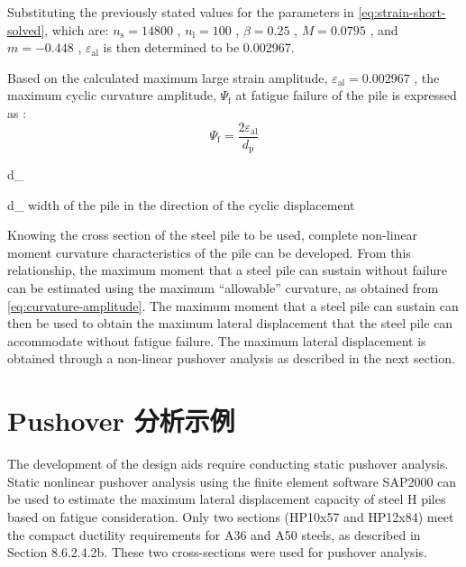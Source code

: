 Substituting the previously stated values for the parameters in \cref{eq:strain-short-solved}, which are: $n_\text{s}=14800$ , $n_\text{l}=100$ ,
$\beta = 0.25$ , $M = 0.0795$ , and $m = −0.448$ , $\varepsilon_\text{al}$ is then determined to be 0.002967.

Based on the calculated maximum large strain amplitude, $\varepsilon_\text{al}=0.002967$ , the maximum cyclic curvature
amplitude, $\Psi_\text{f}$ at fatigue failure of the pile is expressed as :
\begin{equation}
  \label{eq:curvature-amplitude}
  \Psi_\text{f}= \frac{2 \varepsilon_\text{al}}{d_\text{p}}
\end{equation}
\begin{EqDesc}{d_}
  \item[d_\text{p}] width of the pile in the direction of the cyclic displacement
\end{EqDesc}

Knowing the cross section of the steel pile to be used, complete non-linear moment curvature characteristics of the pile can be developed. From this relationship, the maximum moment that a steel pile can sustain without failure can be estimated using the maximum “allowable” curvature, as obtained from \cref{eq:curvature-amplitude}. The maximum moment that a steel pile can sustain can then be used to obtain the maximum lateral displacement that the steel pile can accommodate without fatigue failure. The maximum lateral displacement is obtained through a non-linear pushover analysis as described in the next section.

\section{Pushover 分析示例}
The development of the design aids require conducting static pushover analysis. Static nonlinear pushover analysis using the finite element software SAP2000 can be used to estimate the maximum lateral displacement capacity of steel H piles based on fatigue consideration. Only two sections (HP10x57 and HP12x84) meet the compact ductility requirements for A36 and A50 steels, as described in Section 8.6.2.4.2b. These two cross-sections were used for pushover analysis.
